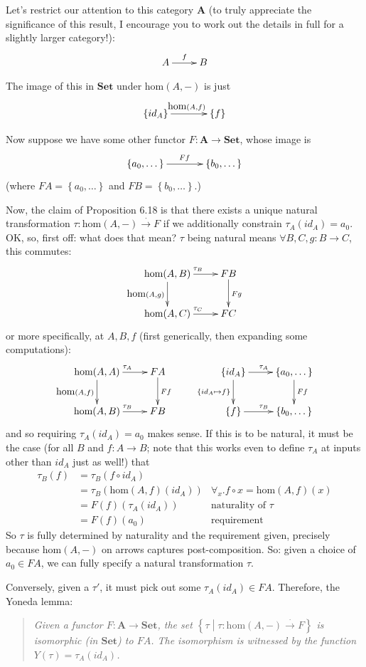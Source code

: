 \documentclass[10pt,letterpaper]{article}
\newcommand{\set}[1]{\left\{#1\right\}}
\begin{document}
Let's restrict our attention to this category $\mathbf{A}$
(to truly appreciate the significance of this result, I encourage you to work out
the details in full for a slightly larger category!):
\[ \xymatrix{ A \ar[r]^f & B } \]

The image of this in $\mathbf{Set}$ under $\mbox{hom}(A,-)$ is just
\[ \xymatrix@C=.5in{ \set{id_A} \ar[r]^{\mbox{hom}(A,f)} & \set{f} } \]

Now suppose we have some other functor $F : \mathbf{A} \to \mathbf{Set}$,
whose image is
\[ \xymatrix@C=.5in{ \set{a_0, \dots} \ar[r]^{Ff} & \set{b_0, \dots} } \]
(where $FA = \set{a_0, \dots}$ and $FB = \set{b_0, \dots}$.)

Now, the claim of Proposition 6.18 is that there exists a unique natural
transformation $\tau : \mbox{hom}(A,-) \stackrel{\cdot}{\to} F$ if we additionally
constrain $\tau_A(id_A) = a_0$.  OK, so, first off: what does that mean? $\tau$ being
natural means $\forall B,C,g : B \to C$, this commutes:
\[ \xymatrix{
  \mbox{hom}(A,B) \ar[r]^{\tau_B} \ar[d]_{\mbox{hom}(A,g)} & FB \ar[d]^{Fg} \\
  \mbox{hom}(A,C) \ar[r]^{\tau_C} & FC 
} \]
or more specifically, at $A,B,f$ (first generically, then expanding some computations):
\[ \xymatrix{
  \mbox{hom}(A,A) \ar[r]^{\tau_A} \ar[d]_{\mbox{hom}(A,f)} & FA \ar[d]^{Ff} \\
  \mbox{hom}(A,B) \ar[r]^{\tau_B} & FB 
} \qquad \xymatrix{
  \set{id_A} \ar[r]^{\tau_A} \ar[d]_{\set{id_A \mapsto f}} & \set{a_0,\dots} \ar[d]^{Ff} \\
  \set{f} \ar[r]^{\tau_B} & \set{b_0,\dots}
} \]
and so requiring $\tau_A(id_A) = a_0$ makes sense.  If this is to be natural, it
must be the case (for all $B$ and $f : A \to B$; note that this works even to
define $\tau_A$ at inputs other than $id_A$ just as well!) that
\begin{align*}
  \tau_B(f) &= \tau_B(f \circ id_A) \\
            &= \tau_B(\mbox{hom}(A,f)(id_A)) & \forall_x . f \circ x = \mbox{hom}(A,f)(x) \\
            &= F(f)(\tau_A(id_A))            & \text{naturality of $\tau$} \\
            &= F(f)(a_0)                     & \text{requirement}
\end{align*}
So $\tau$ is fully determined by naturality and the requirement given,
precisely because $\mbox{hom}(A,-)$ on arrows captures post-composition.
So: given a choice of $a_0 \in FA$, we can fully specify a natural transformation $\tau$.


Conversely, given a $\tau'$, it must pick out some $\tau_A(id_A) \in FA$.  Therefore,
the Yoneda lemma:

\begin{quote}{\em
  Given a functor $F : \mathbf{A} \to \mathbf{Set}$, the set
  $\set{\tau \middle\vert \tau : \mbox{hom}(A,-) \stackrel{\cdot}{\to} F}$
  is isomorphic (in $\mathbf{Set}$) to $FA$.
  The isomorphism is witnessed by the function $Y(\tau) = \tau_A(id_A)$.
}\end{quote}
\end{document}
